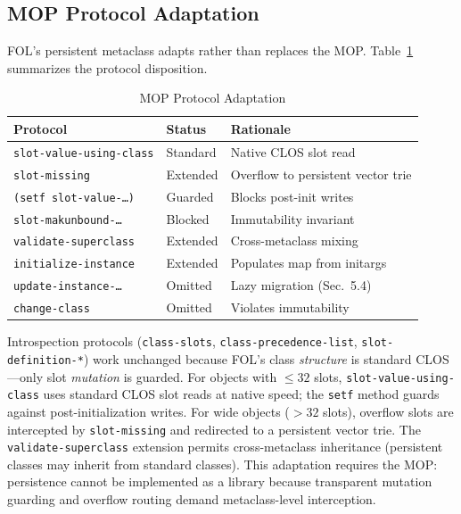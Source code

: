 \documentclass[sigconf,nonacm,review]{acmart}
\begin{document}
\subsection{MOP Protocol Adaptation}

FOL's persistent metaclass adapts rather than replaces the MOP. Table~\ref{tab:mop} summarizes the protocol disposition.

\begin{table}[htbp]
\caption{MOP Protocol Adaptation}
\label{tab:mop}
\small
\begin{tabular}{lll}
\toprule
\textbf{Protocol} & \textbf{Status} & \textbf{Rationale} \\
\midrule
\texttt{slot-value-using-class} & Standard & Native CLOS slot read \\
\texttt{slot-missing} & Extended & Overflow to persistent vector trie \\
\texttt{(setf slot-value-\dots)} & Guarded & Blocks post-init writes \\
\texttt{slot-makunbound-\dots} & Blocked & Immutability invariant \\
\texttt{validate-superclass} & Extended & Cross-metaclass mixing \\
\texttt{initialize-instance} & Extended & Populates map from initargs \\
\texttt{update-instance-\dots} & Omitted & Lazy migration (Sec.~5.4) \\
\texttt{change-class} & Omitted & Violates immutability \\
\bottomrule
\end{tabular}
\end{table}

Introspection protocols (\texttt{class-slots}, \texttt{class-precedence-list}, \texttt{slot-definition-*}) work unchanged because FOL's class \textit{structure} is standard CLOS---only slot \textit{mutation} is guarded. For objects with $\le 32$ slots, \texttt{slot-value-using-class} uses standard CLOS slot reads at native speed; the \texttt{setf} method guards against post-initialization writes. For wide objects ($> 32$ slots), overflow slots are intercepted by \texttt{slot-missing} and redirected to a persistent vector trie. The \texttt{validate-superclass} extension permits cross-metaclass inheritance (persistent classes may inherit from standard classes). This adaptation requires the MOP: persistence cannot be implemented as a library because transparent mutation guarding and overflow routing demand metaclass-level interception.
\end{document}
